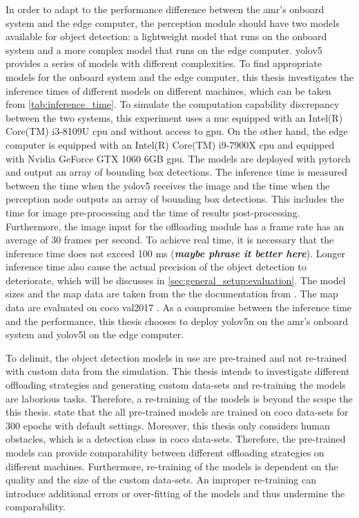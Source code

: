 In order to adapt to the performance difference between the \gls{amr}'s onboard system and the edge computer, the perception module should have two models available for object detection: a lightweight model that runs on the onboard system and a more complex model that runs on the edge computer. \gls{yolov5} provides a series of models with different complexities. To find appropriate models for the onboard system and the edge computer, this thesis investigates the inference times of different models on different machines, which can be taken from \cref{tab:inference_time}. To simulate the computation capability discrepancy between the two systems, this experiment uses a \gls{nuc} equipped with an Intel(R) Core(TM) i3-8109U \gls{cpu} and without access to \gls{gpu}. On the other hand, the edge computer is equipped with an Intel(R) Core(TM) i9-7900X \gls{cpu} and equipped with Nvidia GeForce GTX 1060 6GB \gls{gpu}. The models are deployed with \gls{pytorch} and output an array of bounding box detections. The inference time is measured between the time when the \gls{yolov5} receives the image and the time when the perception node outputs an array of bounding box detections. This includes the time for image pre-processing and the time of results post-processing. Furthermore, the image input for the offloading module has a frame rate has an average of 30 frames per second. To achieve real time, it is necessary that the inference time does not exceed 100 ms (\textbf{\textit{maybe phrase it better here}}). Longer inference time also cause the actual precision of the object detection to deteriorate, which will be discusses in \cref{sec:general_setup:evaluation}. The model sizes and the \gls{map} data are taken from the the documentation from \citeauthor*{Jocher2022} \cite{Jocher2022}. The \gls{map} data are evaluated on \gls{coco} val2017 \cite{Lin2014}. As a compromise between the inference time and the performance, this thesis chooses to deploy \gls{yolov5}n on the \gls{amr}'s onboard system and \gls{yolov5}l on the edge computer. 

To delimit, the object detection models in use are pre-trained and not re-trained with custom data from the simulation. This thesis intends to investigate different offloading strategies and generating custom data-sets and re-training the models are laborious tasks. Therefore, a re-training of the models is beyond the scope the this thesis. \citeauthor*{Jocher2022} \cite{Jocher2022} state that the all pre-trained models are trained on \gls{coco} data-sets for 300 epochs with default settings. Moreover, this thesis only considers human obstacles, which is a detection class in \gls{coco} data-sets. Therefore, the pre-trained models can provide comparability between different offloading strategies on different machines. Furthermore, re-training of the models is dependent on the quality and the size of the custom data-sets. An improper re-training can introduce additional errors or over-fitting of the models and thus undermine the comparability. 

